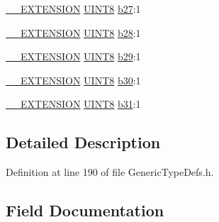 \begin{DoxyCompactItemize}
\item 
\hyperlink{_generic_type_defs_8h_a6f634b0fdcc4febac630fc28e2685ddb}{\+\_\+\+\_\+\+E\+X\+T\+E\+N\+S\+I\+O\+N} \hyperlink{_generic_type_defs_8h_ab27e9918b538ce9d8ca692479b375b6a}{U\+I\+N\+T8} \hyperlink{struct_u_i_n_t32___v_a_l_1_1_____p_a_c_k_e_d_a659b3541d4c7b4ac056f25a5048cc031}{b27}\+:1
\item 
\hyperlink{_generic_type_defs_8h_a6f634b0fdcc4febac630fc28e2685ddb}{\+\_\+\+\_\+\+E\+X\+T\+E\+N\+S\+I\+O\+N} \hyperlink{_generic_type_defs_8h_ab27e9918b538ce9d8ca692479b375b6a}{U\+I\+N\+T8} \hyperlink{struct_u_i_n_t32___v_a_l_1_1_____p_a_c_k_e_d_a204ab487e3a35814106529f2d3d9e33f}{b28}\+:1
\item 
\hyperlink{_generic_type_defs_8h_a6f634b0fdcc4febac630fc28e2685ddb}{\+\_\+\+\_\+\+E\+X\+T\+E\+N\+S\+I\+O\+N} \hyperlink{_generic_type_defs_8h_ab27e9918b538ce9d8ca692479b375b6a}{U\+I\+N\+T8} \hyperlink{struct_u_i_n_t32___v_a_l_1_1_____p_a_c_k_e_d_a73d90b0c91af6bb27968f370cc452391}{b29}\+:1
\item 
\hyperlink{_generic_type_defs_8h_a6f634b0fdcc4febac630fc28e2685ddb}{\+\_\+\+\_\+\+E\+X\+T\+E\+N\+S\+I\+O\+N} \hyperlink{_generic_type_defs_8h_ab27e9918b538ce9d8ca692479b375b6a}{U\+I\+N\+T8} \hyperlink{struct_u_i_n_t32___v_a_l_1_1_____p_a_c_k_e_d_abc2d32d3e84aeb4b88f895cf781680e6}{b30}\+:1
\item 
\hyperlink{_generic_type_defs_8h_a6f634b0fdcc4febac630fc28e2685ddb}{\+\_\+\+\_\+\+E\+X\+T\+E\+N\+S\+I\+O\+N} \hyperlink{_generic_type_defs_8h_ab27e9918b538ce9d8ca692479b375b6a}{U\+I\+N\+T8} \hyperlink{struct_u_i_n_t32___v_a_l_1_1_____p_a_c_k_e_d_acf67779fbbb821894a16fdccbf26259f}{b31}\+:1
\end{DoxyCompactItemize}


\subsection{Detailed Description}


Definition at line 190 of file Generic\+Type\+Defs.\+h.



\subsection{Field Documentation}
\hypertarget{struct_u_i_n_t32___v_a_l_1_1_____p_a_c_k_e_d_a4074b3ee420d7782dce819fb031c29a2}{}
